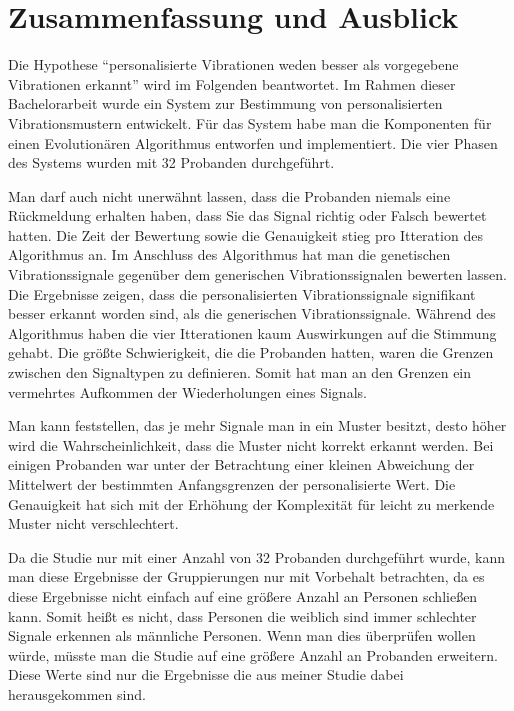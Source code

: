 
\chapter{Zusammenfassung und Ausblick}
\label{ch:Zusammenfassung}


Die Hypothese "`personalisierte Vibrationen weden besser als vorgegebene Vibrationen erkannt"' wird im Folgenden beantwortet.
Im Rahmen dieser Bachelorarbeit wurde ein System zur Bestimmung von personalisierten Vibrationsmustern entwickelt. 
Für das System habe man die Komponenten für einen Evolutionären Algorithmus entworfen und implementiert.
Die vier Phasen des Systems wurden mit 32 Probanden durchgeführt. 

Man darf auch nicht unerwähnt lassen, dass die Probanden niemals eine Rückmeldung erhalten haben, dass Sie das Signal richtig oder Falsch bewertet hatten.
Die Zeit der Bewertung sowie die Genauigkeit stieg pro Itteration des Algorithmus an.
Im Anschluss des Algorithmus hat man die genetischen Vibrationssignale gegenüber dem generischen Vibrationssignalen bewerten lassen. 
Die Ergebnisse zeigen, dass die personalisierten Vibrationssignale signifikant besser erkannt worden sind, als die generischen Vibrationssignale.
Während des Algorithmus haben die vier Itterationen kaum Auswirkungen auf die Stimmung gehabt.
Die größte Schwierigkeit, die die Probanden hatten, waren die Grenzen zwischen den Signaltypen zu definieren.
Somit hat man an den Grenzen ein vermehrtes Aufkommen der Wiederholungen eines Signals.

Man kann feststellen, das je mehr Signale man in ein Muster besitzt, desto höher wird die Wahrscheinlichkeit, dass die Muster nicht korrekt erkannt werden. 
Bei einigen Probanden war unter der Betrachtung einer kleinen Abweichung der Mittelwert der bestimmten Anfangsgrenzen der personalisierte Wert.
Die Genauigkeit hat sich mit der Erhöhung der Komplexität für leicht zu merkende Muster nicht verschlechtert.

Da die Studie nur mit einer Anzahl von 32 Probanden durchgef{\"u}hrt wurde, kann man diese Ergebnisse der Gruppierungen nur mit Vorbehalt betrachten, da es diese Ergebnisse nicht einfach auf eine gr{\"o}{\ss}ere Anzahl an Personen schlie{\ss}en kann. 
Somit hei{\ss}t es nicht, dass Personen die weiblich sind immer schlechter Signale erkennen als m{\"a}nnliche Personen. 
Wenn man dies {\"u}berpr{\"u}fen wollen w{\"u}rde, m{\"u}sste man die Studie auf eine gr{\"o}{\ss}ere Anzahl an Probanden erweitern. 
Diese Werte sind nur die Ergebnisse die aus meiner Studie dabei herausgekommen sind.

